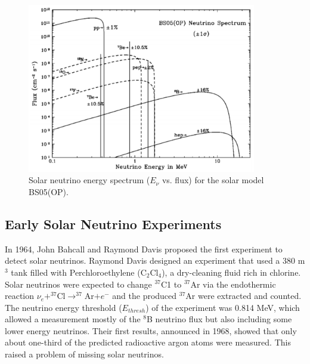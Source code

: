 \documentclass[preprint,12pt]{elsarticle}
\numberwithin{equation}{section}
\begin{document}
\begin{figure}[htbp]
	\centering	
		\includegraphics[width=10cm]{BP05.pdf}
	\caption{ Solar neutrino energy spectrum ($E_\nu$ vs. flux) for the solar model BS05(OP)\cite{BP05}.}
	\label{bp05plot}
\end{figure}

\subsection{Early Solar Neutrino Experiments}
In 1964, John Bahcall and Raymond Davis proposed the first experiment to detect solar neutrinos\cite{bahcall1,raymond}. Raymond Davis designed an experiment that used a 380 m$^3$ tank filled with Perchloroethylene (C$_2$Cl$_4$), a dry-cleaning fluid rich in chlorine. Solar neutrinos were expected to change $^{37}$C1 to $^{37}$Ar via the endothermic reaction $\nu_e+^{37}$Cl$\to^{37}$Ar$+e^-$ and the produced $^{37}$Ar were extracted and counted. The neutrino energy threshold ($E_{thresh}$) of the experiment was 0.814 MeV, which allowed a measurement mostly of the $^8$B neutrino flux but also including some lower energy neutrinos\cite{raymond}. Their first results, announced in 1968, showed that only about one-third of the predicted radioactive argon atoms were measured. This raised a problem of missing solar neutrinos.
\end{document}
